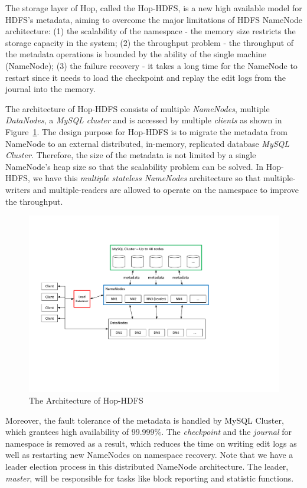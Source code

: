 \documentclass[runningheads,a4paper]{llncs}
\begin{document}
The storage layer of Hop, called the Hop-HDFS, is a new high available model for HDFS's metadata, aiming to overcome the major limitations of HDFS NameNode architecture: (1) the scalability of the namespace - the memory size restricts the storage capacity in the system; (2) the throughput problem - the throughput of the metadata operations is bounded by the ability of the single machine (NameNode); (3) the failure recovery - it takes a long time for the NameNode to restart since it needs to load the checkpoint and replay the edit logs from the journal into the memory.

The architecture of Hop-HDFS consists of multiple \textit{NameNodes}, multiple \textit{DataNodes}, a \textit{MySQL cluster} and is accessed by multiple \textit{clients} as shown in Figure~\ref{fig:hophdfsar}. The design purpose for Hop-HDFS is to migrate the metadata from NameNode to an external distributed, in-memory, replicated database \textit{MySQL Cluster}. Therefore, the size of the metadata is not limited by a single NameNode's heap size so that the scalability problem can be solved. In Hop-HDFS, we have this \textit{multiple stateless NameNodes} architecture so that multiple-writers and multiple-readers are allowed to operate on the namespace to improve the throughput.

\begin{figure}[h!]
	\centering
	\includegraphics[scale=0.7]{HopHDFSArchitecture2.pdf}
	\caption{The Architecture of Hop-HDFS}
	\label{fig:hophdfsar}
\end{figure}

Moreover, the fault tolerance of the metadata is handled by MySQL Cluster, which grantees high availability of 99.999\%. The \textit{checkpoint} and the \textit{journal} for namespace is removed as a result, which reduces the time on writing edit logs as well as restarting new NameNodes on namespace recovery. Note that we have a leader election process in this distributed NameNode architecture. The leader, \textit{master}, will be responsible for tasks like block reporting and statistic functions.
\end{document}
